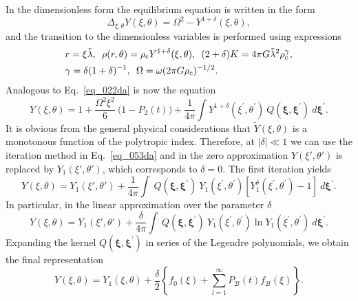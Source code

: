 \documentclass{caosp308}
\begin{document}
In the dimensionless form the equilibrium equation is written in the form
\begin{equation}
\label{eq_051da}
\Delta_{\xi,\theta}Y(\xi,\theta)=\Omega^2-Y^{1+\delta}(\xi,\theta),
\end{equation}
and the transition to the dimensionless variables is performed using expressions
\begin{eqnarray}
\label{eq_052da}
\begin{split}
&r=\xi\tilde{\lambda},\,\,\,\rho(r,\theta)=\rho_{\rm c}Y^{1+\delta}(\xi,\theta),\,\,\,
(2+\delta)K=4\pi G\tilde{\lambda}^2\rho_{\rm c}^\gamma,\\
&\gamma=\delta(1+\delta)^{-1},\,\,\,\Omega=\omega(2\pi G\rho_{\rm c})^{-1/2}.
\end{split}
\end{eqnarray}
Analogous to Eq.~\eqref{eq_022da} is now the equation
\begin{equation}
\label{eq_053da}
Y(\xi,\theta)=1+\frac{\Omega^2\xi^2}{6}\:\biggl(1-P_2 (t)\biggr)
+\frac{1}{4\pi}\int Y^{1+\delta}(\xi^{'}, \theta^{'})\:Q ({\boldsymbol\xi},{\boldsymbol\xi}^{'})\:d{\boldsymbol\xi}^{'}.
\end{equation}
It is obvious from the general physical considerations that $\tilde{Y}(\xi,\theta)$ is a monotonous function of the polytropic index. Therefore, at $|\delta|\ll1$ we can use the iteration method in Eq.~\eqref{eq_053da} and in the zero approximation $Y(\xi',\theta')$ is replaced by $Y_1(\xi',\theta')$, which corresponds to $\delta=0$. The first iteration yields
\begin{equation}
\label{eq_054da}
Y(\xi,\theta)=Y_1(\xi',\theta')
+\frac{1}{4\pi}\int\:Q ({\boldsymbol\xi},{\boldsymbol\xi}^{'})\:Y_1(\xi^{'},\theta^{'})[Y_1^{\delta}(\xi^{'}, \theta^{'})-1]\:d{\boldsymbol\xi}^{'}.
\end{equation}
In particular, in the linear approximation over the parameter $\delta$
\begin{equation}
\label{eq_055da}
Y(\xi,\theta)=Y_1(\xi',\theta')
+\frac{\delta}{4\pi}\int\:Q ({\boldsymbol\xi},{\boldsymbol\xi}^{'})\:Y_1(\xi^{'},\theta^{'})\ln Y_1(\xi^{'},\theta^{'})\:d{\boldsymbol\xi}^{'}.
\end{equation}
Expanding the kernel $Q ({\boldsymbol\xi},{\boldsymbol\xi}^{'})$ in series of the Legendre polynomials, we obtain the final representation
\begin{equation}
\label{eq_056da}
Y(\xi,\theta)=Y_1(\xi,\theta)+\frac{\delta}{2}\left\{f_{0}(\xi)+\sum\limits_{l=1}^{\infty}P_{2l}(t)f_{2l}(\xi)\right\}.
\end{equation}
\end{document}
